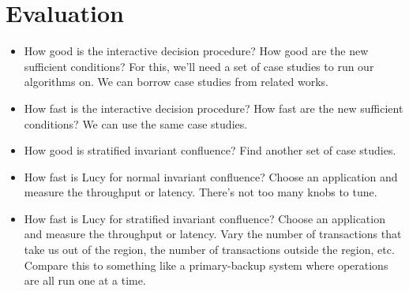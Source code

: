 \section{Evaluation}
\begin{itemize}
  \item
    How good is the interactive decision procedure? How good are the new
    sufficient conditions? For this, we'll need a set of case studies to run
    our algorithms on. We can borrow case studies from related works.
  \item
    How fast is the interactive decision procedure? How fast are the new
    sufficient conditions? We can use the same case studies.
  \item
    How good is stratified invariant confluence? Find another set of case
    studies.
  \item
    How fast is Lucy for normal invariant confluence? Choose an application and
    measure the throughput or latency. There's not too many knobs to tune.
  \item
    How fast is Lucy for stratified invariant confluence? Choose an application
    and measure the throughput or latency. Vary the number of transactions that
    take us out of the region, the number of transactions outside the region,
    etc. Compare this to something like a primary-backup system where
    operations are all run one at a time.
\end{itemize}
